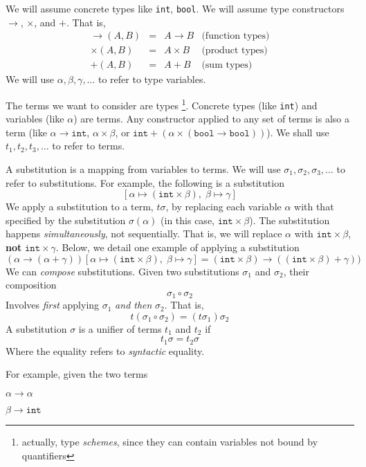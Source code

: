 {We will assume concrete types like \texttt{int}, \texttt{bool}. We will assume type constructors $\to$, $\times$, and $+$. That is, 
\[\begin{array}{lllr}
    \to(A, B) &=& A \to B & \text{(function types)} \\
    \times(A, B) &=& A \times B & \text{(product types)} \\
    +(A, B) &=& A + B & \text{(sum types)}
\end{array}
\]
We will use $\alpha, \beta, \gamma, \ldots$ to refer to type variables. 

The terms we want to consider are types \footnote{actually, type \textit{schemes}, since they can contain variables not bound by quantifiers}. Concrete types (like \texttt{int}) and variables (like $\alpha$) are terms. Any constructor applied to any set of terms is also a term (like $\alpha \to \texttt{int}$, $\alpha \times \beta$, or $\texttt{int} + (\alpha \times (\texttt{bool} \to \texttt{bool}))$). We shall use $t_1, t_2, t_3, \ldots$ to refer to terms.

A substitution is a mapping from variables to terms. We will use $\sigma_1, \sigma_2, \sigma_3, \ldots$ to refer to substitutions. For example, the following is a substitution
\[[\alpha \mapsto (\texttt{int} \times \beta), \; \beta \mapsto \gamma]\]
We apply a substitution to a term, $t \sigma$, by replacing each variable $\alpha$ with that specified by the substitution $\sigma(\alpha)$ (in this case, $ \texttt{int} \times \beta$). The substitution happens \textit{simultaneously}, not sequentially. That is, we will replace $\alpha$ with $\texttt{int} \times \beta$, \textbf{not} $\texttt{int} \times \gamma$. Below, we detail one example of applying a substitution 
\[(\alpha \to (\alpha + \gamma))[\alpha \mapsto (\texttt{int} \times \beta), \; \beta \mapsto \gamma] = (\texttt{int} \times \beta) \to ((\texttt{int} \times \beta) + \gamma))\]
%
We can \textit{compose} substitutions. Given two substitutions $\sigma_1$ and $\sigma_2$, their composition 
\[\sigma_1 \circ \sigma_2\]
Involves \textit{first} applying $\sigma_1$ \textit{and then} $\sigma_2$. That is, 
\[t (\sigma_1 \circ \sigma_2) = (t \sigma_1) \sigma_2 \]
%
A substitution $\sigma$ is a unifier of terms $t_1$ and $t_2$ if
\[t_1 \sigma = t_2 \sigma\]
Where the equality refers to \textit{syntactic} equality. 

For example, given the two terms

\begin{minipage}[t]{0.5\textwidth}
\centering
$\alpha \to \alpha$
\end{minipage}%
\begin{minipage}[t]{0.5\textwidth}
\centering
$\beta \to \texttt{int}$
\end{minipage}

}
